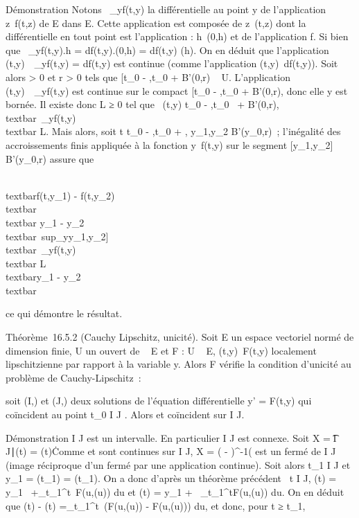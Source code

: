 \documentclass[]{article}
\begin{document}
Démonstration Notons \partial~\_yf(t,y) la différentielle au point y de
l'application z\mapsto~f(t,z) de E dans E. Cette
application est composée de z\mapsto~(t,z) dont la
différentielle en tout point est l'application \jmath :
h\mapsto~(0,h) et de l'application f. Si bien que
\partial~\_yf(t,y).h = df(t,y).(0,h) = df(t,y) \cdot \jmath(h). On en déduit que
l'application (t,y)\mapsto~\partial~\_yf(t,y) =
df(t,y) \cdot \jmath est continue (comme l'application
(t,y)\mapsto~df(t,y)). Soit alors \eta \textgreater{} 0
et r \textgreater{} 0 tels que {[}t\_0 - \eta,t\_0 + \eta{]} \times
B'(0,r) \subset~ U. L'application
(t,y)\mapsto~\partial~\_yf(t,y) est continue sur le
compact {[}t\_0 - \eta,t\_0 + \eta{]} \times B'(0,r), donc elle y
est bornée. Il existe donc L ≥ 0 tel que
\forall~(t,y) \in {[}t\_0 - \eta,t\_0~ +
\eta{]} \times B'(0,r),
\\textbar{}\partial~\_yf(t,y)\\textbar{} \leq
L. Mais alors, soit t \in {[}t\_0 - \eta,t\_0 + \eta{]},
y\_1,y\_2 \in B'(y\_0,r)~; l'inégalité des
accroissements finis appliquée à la fonction
y\mapsto~f(t,y) sur le segment
{[}y\_1,y\_2{]} \subset~ B'(y\_0,r) assure que

\\textbar{}f(t,y\_1) -
f(t,y\_2)\\textbar{} \leq\\textbar{}
y\_1 -
y\_2\\textbar{}\
sup\_y\in{[}y\_1,y\_2{]}\\textbar{}\partial~\_yf(t,y)\\textbar{}
\leq L\\textbar{}y\_1 -
y\_2\\textbar{}

ce qui démontre le résultat.

Théorème~16.5.2 (Cauchy Lipschitz, unicité). Soit E un espace vectoriel
normé de dimension finie, U un ouvert de \mathbb{R}~ \times E et F : U \rightarrow~ E,
(t,y)\mapsto~F(t,y) localement lipschitzienne par
rapport à la variable y. Alors F vérifie la condition d'unicité au
problème de Cauchy-Lipschitz~:

soit (I,\phi) et (J,\psi) deux solutions de l'équation différentielle y' =
F(t,y) qui coïncident au point t\_0 \in I \bigcap J . Alors \phi et \psi
coïncident sur I \bigcap J.

Démonstration I \bigcap J est un intervalle. En particulier I \bigcap J est connexe.
Soit X = \t \in I \bigcap J∣\phi(t) =
\psi(t)\. Comme \phi et \psi sont continues sur I \bigcap J, X = (\phi
- \psi)^-1(\0\) est un fermé de
I \bigcap J (image réciproque d'un fermé par une application continue). Soit
alors t\_1 \in I \bigcap J et y\_1 = \phi(t\_1) =
\psi(t\_1). On a donc d'après un théorème précédent
\forall~t \in I \bigcap J, \phi(t) = y\_1~
+\int  \_t\_1^t~F(u,\phi(u))
du et \psi(t) = y\_1 +\int ~
\_t\_1^tF(u,\psi(u)) du. On en déduit que \phi(t) - \psi(t)
=\int  \_t\_1^t~(F(u,\phi(u))
- F(u,\psi(u))) du, et donc, pour t ≥ t\_1,
\end{document}

